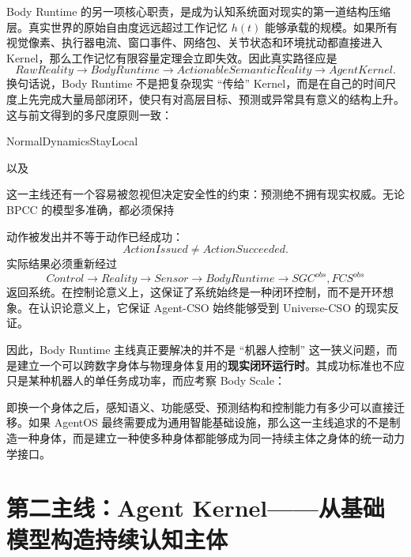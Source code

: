 Body Runtime 的另一项核心职责，是成为认知系统面对现实的第一道结构压缩层。真实世界的原始自由度远远超过工作记忆 $h(t)$ 能够承载的规模。如果所有视觉像素、执行器电流、窗口事件、网络包、关节状态和环境扰动都直接进入 Kernel，那么工作记忆有限容量定理会立即失效。因此真实路径应是
\[
RawReality
\rightarrow
BodyRuntime
\rightarrow
ActionableSemanticReality
\rightarrow
AgentKernel.
\]
换句话说，Body Runtime 不是把复杂现实 ``传给'' Kernel，而是在自己的时间尺度上先完成大量局部闭环，使只有对高层目标、预测或异常具有意义的结构上升。这与前文得到的多尺度原则一致：
\begin{statementbox}
NormalDynamicsStayLocal
\end{statementbox}
以及
\begin{statementbox}
\centering
{}
\end{statementbox}

这一主线还有一个容易被忽视但决定安全性的约束：预测绝不拥有现实权威。无论 BPCC 的模型多准确，都必须保持
\begin{statementbox}
\centering
{}
\end{statementbox}
动作被发出并不等于动作已经成功：
\[
ActionIssued \neq ActionSucceeded.
\]
实际结果必须重新经过
\[
Control
\rightarrow
Reality
\rightarrow
Sensor
\rightarrow
BodyRuntime
\rightarrow
SGC^{obs},FCS^{obs}
\]
返回系统。在控制论意义上，这保证了系统始终是一种闭环控制，而不是开环想象。在认识论意义上，它保证 Agent-CSO 始终能够受到 Universe-CSO 的现实反证。

因此，Body Runtime 主线真正要解决的并不是 ``机器人控制'' 这一狭义问题，而是建立一个可以跨数字身体与物理身体复用的\textbf{现实闭环运行时}。其成功标准也不应只是某种机器人的单任务成功率，而应考察 Body Scale：
\begin{statementbox}
\centering
{}
\end{statementbox}
即换一个身体之后，感知语义、功能感受、预测结构和控制能力有多少可以直接迁移。如果 AgentOS 最终需要成为通用智能基础设施，那么这一主线追求的不是制造一种身体，而是建立一种使多种身体都能够成为同一持续主体之身体的统一动力学接口。

\section{第二主线：Agent Kernel——从基础模型构造持续认知主体}
\label{sec:roadmap-agent-kernel}

